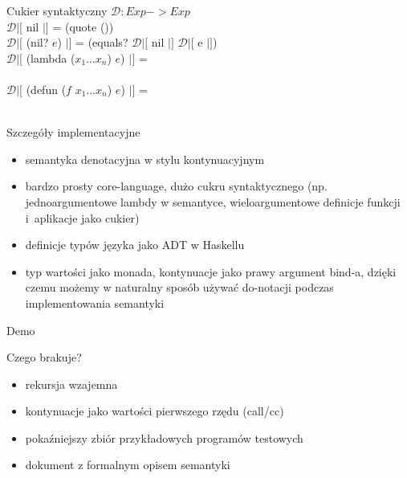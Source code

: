 \documentclass[12pt,serif]{beamer}
\begin{document}
\begin{frame}{Cukier syntaktyczny}
$\mathcal{D} : Exp -> Exp$ \newline
\\
$\mathcal{D}|[$ nil $|]$ = (quote ()) \\
$\mathcal{D}|[$ (nil? $e$) $|]$ = 
   (equals? $\mathcal{D}|[$ nil $|]$ $\mathcal{D}|[$ e $|]$) \newline
\\
$\mathcal{D}|[$ (lambda ($x_1 \ldots x_n$) $e$) $|]$ = \\
\newline
\\
$\mathcal{D}|[$ (defun ($f$ $x_1 \ldots x_n$) $e$) $|]$ = \\ 
\\

\end{frame}


\begin{frame}{Szczegóły implementacyjne}
\begin{itemize}
  \item semantyka denotacyjna w stylu kontynuacyjnym
  \item bardzo prosty core-language, dużo cukru syntaktycznego
        (np. jednoargumentowe lambdy w semantyce,
        wieloargumentowe definicje funkcji i~aplikacje jako cukier)
  \item definicje typów języka jako ADT w Haskellu
  \item typ wartości jako monada, kontynuacje jako prawy argument bind-a,
        dzięki czemu możemy w naturalny sposób używać do-notacji podczas
        implementowania semantyki
\end{itemize}
\end{frame}

\begin{frame}
\begin{center}
   \LARGE{Demo}
\end{center}
\end{frame}

\begin{frame}{Czego brakuje?}
\begin{itemize}
   \item rekursja wzajemna
   \item kontynuacje jako wartości pierwszego rzędu (call/cc)
   \item pokaźniejszy zbiór przykładowych programów testowych
   \item dokument z formalnym opisem semantyki
\end{itemize}
\end{frame}
\end{document}
